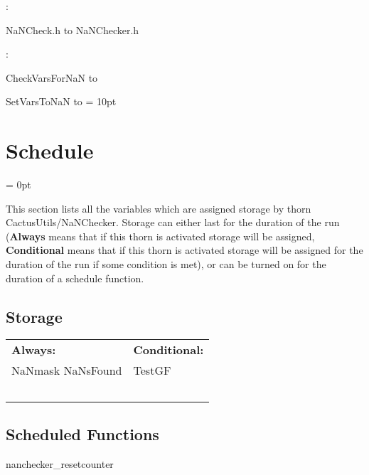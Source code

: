 \documentclass{article}
\begin{document}
\vspace{5mm}

: 



NaNCheck.h to NaNChecker.h
\vspace{2mm}

: 



CheckVarsForNaN to 

SetVarsToNaN to 
\vspace{2mm}\parskip = 10pt 

\section{Schedule} 


\parskip = 0pt


\noindent This section lists all the variables which are assigned storage by thorn CactusUtils/NaNChecker.  Storage can either last for the duration of the run ({\bf Always} means that if this thorn is activated storage will be assigned, {\bf Conditional} means that if this thorn is activated storage will be assigned for the duration of the run if some condition is met), or can be turned on for the duration of a schedule function.


\subsection*{Storage}

\hspace{5mm}

 \begin{tabular*}{160mm}{ll} 

{\bf Always:}& {\bf Conditional:} \\ 
 NaNmask NaNsFound &  TestGF\\ 
~ & ~\\ 
\end{tabular*} 


\subsection*{Scheduled Functions}
\vspace{5mm}


\hspace{5mm} nanchecker\_resetcounter 

\hspace{5mm}{\it reset the nanchecker::nansfound counter } 
\end{document}
